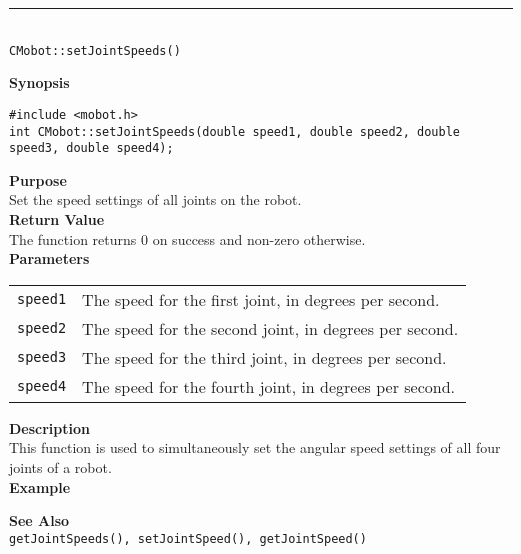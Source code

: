 \noindent
\vspace{5pt}
\rule{4.5in}{0.015in}\\
\noindent
{\LARGE \texttt{CMobot::setJointSpeeds()}}\\
{}

\noindent
{\bf Synopsis}
\vspace{-8pt}
\begin{verbatim}
#include <mobot.h>
int CMobot::setJointSpeeds(double speed1, double speed2, double speed3, double speed4);
\end{verbatim}

\noindent
{\bf Purpose}\\
Set the speed settings of all joints on the robot.\\

\noindent
{\bf Return Value}\\
The function returns 0 on success and non-zero otherwise.\\

\noindent
{\bf Parameters}
\vspace{-0.1in}
\begin{description}
\item               
\begin{tabular}{p{10 mm}p{145 mm}}
\texttt{speed1} & The speed for the first joint, in degrees per second. \\
\texttt{speed2} & The speed for the second joint, in degrees per second. \\
\texttt{speed3} & The speed for the third joint, in degrees per second. \\
\texttt{speed4} & The speed for the fourth joint, in degrees per second. \\
\end{tabular}
\end{description}

\noindent
{\bf Description}\\
This function is used to simultaneously set the angular speed settings of
all four joints of a robot. \\

\noindent
{\bf Example}\\
\noindent

\noindent
{\bf See Also}\\
\texttt{getJointSpeeds(), setJointSpeed(), getJointSpeed()}

